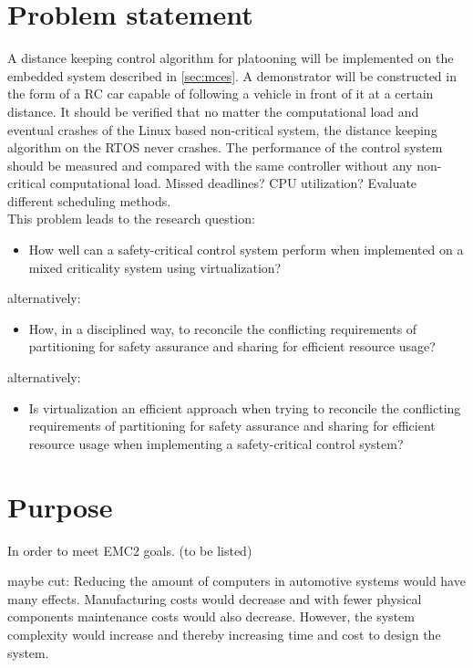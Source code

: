 \section{Problem statement}
\label{sec:problem}
A distance keeping control algorithm for platooning will be implemented on the embedded system described in \ref{sec:mces}. A demonstrator will be constructed in the form of a RC car capable of following a vehicle in front of it at a certain distance. It should be verified that no matter the computational load and eventual crashes of the Linux based non-critical system, the distance keeping algorithm on the RTOS never crashes. The performance of the control system should be measured and compared with the same controller without any non-critical computational load. Missed deadlines? CPU utilization? Evaluate different scheduling methods.\\

This problem leads to the research question: 
\begin{itemize}
\item How well can a safety-critical control system perform when implemented on a mixed criticality system using virtualization?
\end{itemize}
alternatively:
\begin{itemize}
\item How, in a disciplined way, to reconcile the conflicting requirements of partitioning for safety assurance and sharing for efficient resource usage? \cite{burns2016}
\end{itemize}
alternatively:
\begin{itemize}
\item Is virtualization an efficient approach when trying to reconcile the conflicting requirements of partitioning for safety assurance and sharing for efficient resource usage when implementing a safety-critical control system?
\end{itemize}

\section{Purpose}
In order to meet EMC2 goals. (to be listed)

maybe cut: Reducing the amount of computers in automotive systems would have many effects. Manufacturing costs would decrease and with fewer physical components maintenance costs would also decrease. However, the system complexity would increase and thereby increasing time and cost to design the system. %

